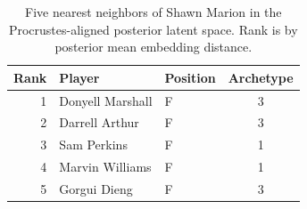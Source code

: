 \begin{table}[htbp]
  \centering\small
  \begin{tabular}{rllc}
    \toprule
    Rank & Player & Position & Archetype \\
    \midrule
    1 & Donyell Marshall & F & 3 \\
    2 & Darrell Arthur & F & 3 \\
    3 & Sam Perkins & F & 1 \\
    4 & Marvin Williams & F & 1 \\
    5 & Gorgui Dieng & F & 3 \\
    \bottomrule
  \end{tabular}
  \caption{Five nearest neighbors of Shawn Marion in the Procrustes-aligned posterior latent space. Rank is by posterior mean embedding distance.}
  \label{tab:Shawn_Marion_neighbors}
\end{table}

